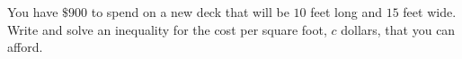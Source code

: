 You have $\$900$ to spend on a new deck that will be $10$ feet long and $15$ feet wide. Write and solve an inequality for the cost per square foot, $c$ dollars, that you can afford.
